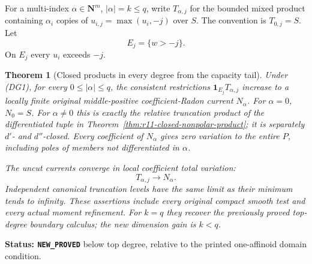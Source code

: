 \documentclass[11pt,a4paper]{article}
\numberwithin{equation}{section}
\newtheorem{theorem}{Theorem}[section]
\theoremstyle{definition}
\theoremstyle{remark}
\begin{document}
For a multi-index $\alpha\in\mathbf N^m$, $|\alpha|=k\leq q$,
write $T_{\alpha,j}$ for the bounded mixed product containing
$\alpha_i$ copies of $u_{i,j}=\max(u_i,-j)$ over $S$.
The convention is $T_{0,j}=S$. Let
\[
                 E_j=\{w>-j\}.
 \tag{DG6}
\]
On $E_j$ every $u_i$ exceeds $-j$.

\begin{theorem}[Closed products in every degree from the capacity tail]
\label{thm:r11-boundary-all-degree-products}
Under (DG1), for every $0\leq|\alpha|\leq q$, the consistent
restrictions $\mathbf1_{E_j}T_{\alpha,j}$ increase to a locally
finite original middle-positive coefficient-Radon current
$N_\alpha$. For $\alpha=0$, $N_0=S$.
For $\alpha\ne0$ this is exactly the relative truncation product
of the differentiated tuple in
Theorem~\ref{thm:r11-closed-nonpolar-product}; it is separately
$d'$- and $d''$-closed. Every coefficient of $N_\alpha$ gives
zero variation to the entire $P$, including poles of members
not differentiated in $\alpha$.

The uncut currents converge in local coefficient total variation:
\[
                          T_{\alpha,j}\longrightarrow N_\alpha.
 \tag{DG7}
\]
Independent canonical truncation levels have the same limit as
their minimum tends to infinity. These assertions include every
original compact smooth test and every actual moment refinement.
For $k=q$ they recover the previously proved top-degree boundary
calculus; the new dimension gain is $k<q$.
\end{theorem}

\noindent\textbf{Status: \texttt{NEW\_PROVED}} below top degree,
relative to the printed one-affinoid domain condition.
\end{document}
